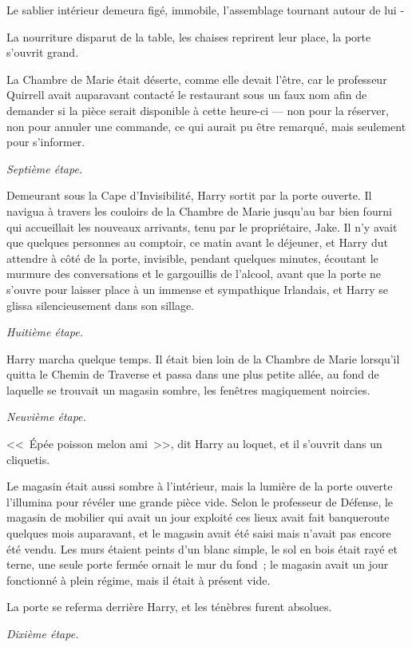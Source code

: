 Le sablier intérieur demeura figé, immobile, l'assemblage tournant autour de lui -

La nourriture disparut de la table, les chaises reprirent leur place, la porte s'ouvrit grand.

La Chambre de Marie était déserte, comme elle devait l'être, car le professeur Quirrell avait auparavant contacté le restaurant sous un faux nom afin de demander si la pièce serait disponible à cette heure-ci — non pour la réserver, non pour annuler une commande, ce qui aurait pu être remarqué, mais seulement pour s'informer.

\emph{Septième étape.}

Demeurant sous la Cape d'Invisibilité, Harry sortit par la porte ouverte. Il navigua à travers les couloirs de la Chambre de Marie jusqu'au bar bien fourni qui accueillait les nouveaux arrivants, tenu par le propriétaire, Jake. Il n'y avait que quelques personnes au comptoir, ce matin avant le déjeuner, et Harry dut attendre à côté de la porte, invisible, pendant quelques minutes, écoutant le murmure des conversations et le gargouillis de l'alcool, avant que la porte ne s'ouvre pour laisser place à un immense et sympathique Irlandais, et Harry se glissa silencieusement dans son sillage.

\emph{Huitième étape.}

Harry marcha quelque temps. Il était bien loin de la Chambre de Marie lorsqu'il quitta le Chemin de Traverse et passa dans une plus petite allée, au fond de laquelle se trouvait un magasin sombre, les fenêtres magiquement noircies.

\emph{Neuvième étape.}

<<~Épée poisson melon ami~>>, dit Harry au loquet, et il s'ouvrit dans un cliquetis.

Le magasin était aussi sombre à l'intérieur, mais la lumière de la porte ouverte l'illumina pour révéler une grande pièce vide. Selon le professeur de Défense, le magasin de mobilier qui avait un jour exploité ces lieux avait fait banqueroute quelques mois auparavant, et le magasin avait été saisi mais n'avait pas encore été vendu. Les murs étaient peints d'un blanc simple, le sol en bois était rayé et terne, une seule porte fermée ornait le mur du fond~; le magasin avait un jour fonctionné à plein régime, mais il était à présent vide.

La porte se referma derrière Harry, et les ténèbres furent absolues.

\emph{Dixième étape.}

